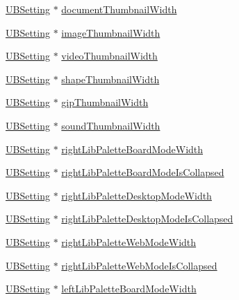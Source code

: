 \begin{DoxyCompactItemize}
\item 
\hyperlink{class_u_b_setting}{U\-B\-Setting} $\ast$ \hyperlink{class_u_b_settings_a6a94e430347f10aa5882ef4c26cbe918}{document\-Thumbnail\-Width}
\item 
\hyperlink{class_u_b_setting}{U\-B\-Setting} $\ast$ \hyperlink{class_u_b_settings_a0b93ca2ce7cf596982b1611393fd900f}{image\-Thumbnail\-Width}
\item 
\hyperlink{class_u_b_setting}{U\-B\-Setting} $\ast$ \hyperlink{class_u_b_settings_afbbe4e4356efe6c65b2b9495d5afeb80}{video\-Thumbnail\-Width}
\item 
\hyperlink{class_u_b_setting}{U\-B\-Setting} $\ast$ \hyperlink{class_u_b_settings_a775f91fb0a35180d4df55234201e431d}{shape\-Thumbnail\-Width}
\item 
\hyperlink{class_u_b_setting}{U\-B\-Setting} $\ast$ \hyperlink{class_u_b_settings_abd7c3af35f64a130229bdd2d0ac6966c}{gip\-Thumbnail\-Width}
\item 
\hyperlink{class_u_b_setting}{U\-B\-Setting} $\ast$ \hyperlink{class_u_b_settings_a9c592dd313b4b929821f21f310342fdc}{sound\-Thumbnail\-Width}
\item 
\hyperlink{class_u_b_setting}{U\-B\-Setting} $\ast$ \hyperlink{class_u_b_settings_a3afa5ce4240c63f9932185937c6410c5}{right\-Lib\-Palette\-Board\-Mode\-Width}
\item 
\hyperlink{class_u_b_setting}{U\-B\-Setting} $\ast$ \hyperlink{class_u_b_settings_a839314db2375f5134f5c761232686321}{right\-Lib\-Palette\-Board\-Mode\-Is\-Collapsed}
\item 
\hyperlink{class_u_b_setting}{U\-B\-Setting} $\ast$ \hyperlink{class_u_b_settings_a984d587f2762540e8e766bfe4ba828c5}{right\-Lib\-Palette\-Desktop\-Mode\-Width}
\item 
\hyperlink{class_u_b_setting}{U\-B\-Setting} $\ast$ \hyperlink{class_u_b_settings_a7c74a74ea61db0b6160e6da97f639d06}{right\-Lib\-Palette\-Desktop\-Mode\-Is\-Collapsed}
\item 
\hyperlink{class_u_b_setting}{U\-B\-Setting} $\ast$ \hyperlink{class_u_b_settings_a33295d163e4f9af2326a0b969b0fdcc4}{right\-Lib\-Palette\-Web\-Mode\-Width}
\item 
\hyperlink{class_u_b_setting}{U\-B\-Setting} $\ast$ \hyperlink{class_u_b_settings_a7f8d2359182defdb0c0b64b92f68f021}{right\-Lib\-Palette\-Web\-Mode\-Is\-Collapsed}
\item 
\hyperlink{class_u_b_setting}{U\-B\-Setting} $\ast$ \hyperlink{class_u_b_settings_a3a4a5e502951a3bde57cca8bdb5736cb}{left\-Lib\-Palette\-Board\-Mode\-Width}
\item 

\end{DoxyCompactItemize}

